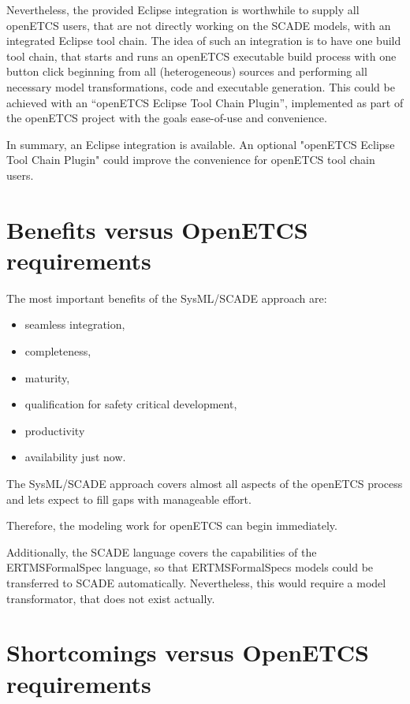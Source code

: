 Nevertheless, the provided Eclipse integration is worthwhile to supply all openETCS users, that are not directly working on the SCADE models, with an integrated Eclipse tool chain. 
The idea of such an integration is to have one build tool chain, that starts and runs an openETCS executable build process with one button click beginning from all (heterogeneous) sources and performing all necessary model transformations, code and executable generation. 
This could be achieved with an "`openETCS Eclipse Tool Chain Plugin"', implemented as part of the openETCS project with the goals ease-of-use and convenience. 

In summary, an Eclipse integration is available. An optional "openETCS Eclipse Tool Chain Plugin" could improve the convenience for openETCS tool chain users. 


\section{Benefits versus OpenETCS requirements}

The most important benefits of the SysML/SCADE approach are: 

\begin{itemize}
	\item seamless integration,
	\item completeness,
	\item maturity,
	\item qualification for safety critical development,
	\item productivity
	\item availability just now.
\end{itemize}
 
The SysML/SCADE approach covers almost all aspects of the openETCS process and lets expect to fill gaps with manageable effort.

Therefore, the modeling work for openETCS can begin immediately. 

Additionally, the SCADE language covers the capabilities of the ERTMSFormalSpec language, so that ERTMSFormalSpecs models could be transferred to SCADE automatically. Nevertheless, this would require a model transformator, that does not exist actually.   


\section{Shortcomings versus OpenETCS requirements}

